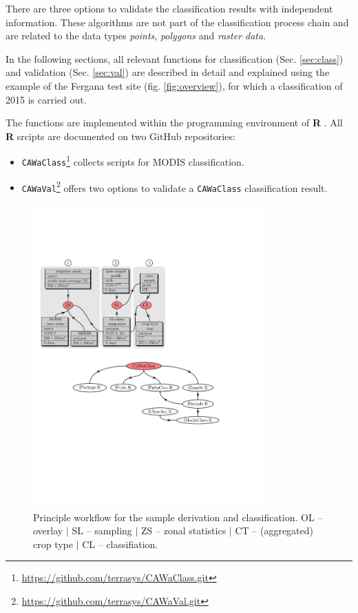 There are three options to validate the classification results with independent information. These algorithms  are not part of the classification process chain and are related to the data types \textit{points}, \textit{polygons} and \textit{raster data}.\

In the following sections, all relevant functions for classification (Sec. \ref{sec:class}) and validation (Sec. \ref{sec:val}) are described in detail and explained using the example of the Fergana test site (fig. \ref{fig:overview}), for which a classification of 2015 is carried out.\ 

The functions are implemented within the programming environment of \textbf{R} \citep[version 3.5.1; ][]{R2017}. All \textbf{R} srcipts are documented on two GitHub repositories:

\begin{itemize}
\item \texttt{CAWaClass}\footnote{\url{https://github.com/terrasys/CAWaClass.git}} collects scripts for MODIS classification.
\item \texttt{CAWaVal}\footnote{\url{https://github.com/terrasys/CAWaVal.git}} offers two options to validate a \texttt{CAWaClass} classification result.
\end{itemize}


\begin{figure}[p]
\centering\includegraphics[width=0.8\textwidth]{figures/CaWA_workflow.pdf}
\caption{Principle workflow for the sample derivation and classification. OL -- overlay $|$ SL -- sampling $|$ ZS -- zonal statistics $|$ CT -- (aggregated) crop type  $|$ CL -- classifiation.}\label{fig:workflow}
\end{figure}

